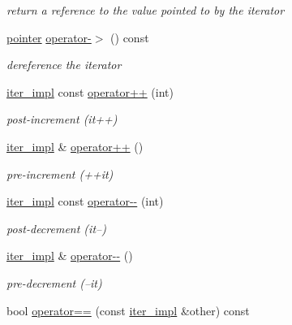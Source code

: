 \begin{DoxyCompactItemize}
\begin{DoxyCompactList}\small\item\em return a reference to the value pointed to by the iterator \end{DoxyCompactList}\item 
\hyperlink{classnlohmann_1_1detail_1_1iter__impl_a69e52f890ce8c556fd68ce109e24b360}{pointer} \hyperlink{classnlohmann_1_1detail_1_1iter__impl_a6da3d2b34528aff328f3dcb513076dec}{operator-\/$>$} () const
\begin{DoxyCompactList}\small\item\em dereference the iterator \end{DoxyCompactList}\item 
\hyperlink{classnlohmann_1_1detail_1_1iter__impl}{iter\+\_\+impl} const \hyperlink{classnlohmann_1_1detail_1_1iter__impl_a7d2397773b2dce42f30f0375a6a1d850}{operator++} (int)
\begin{DoxyCompactList}\small\item\em post-\/increment (it++) \end{DoxyCompactList}\item 
\hyperlink{classnlohmann_1_1detail_1_1iter__impl}{iter\+\_\+impl} \& \hyperlink{classnlohmann_1_1detail_1_1iter__impl_abdfe2a7f464400a7ab572782d14b922f}{operator++} ()
\begin{DoxyCompactList}\small\item\em pre-\/increment (++it) \end{DoxyCompactList}\item 
\hyperlink{classnlohmann_1_1detail_1_1iter__impl}{iter\+\_\+impl} const \hyperlink{classnlohmann_1_1detail_1_1iter__impl_a1fc43e764467b8ea4a4cdd01f629d757}{operator-\/-\/} (int)
\begin{DoxyCompactList}\small\item\em post-\/decrement (it--) \end{DoxyCompactList}\item 
\hyperlink{classnlohmann_1_1detail_1_1iter__impl}{iter\+\_\+impl} \& \hyperlink{classnlohmann_1_1detail_1_1iter__impl_a84e689fb581d651d130039f7cb81494a}{operator-\/-\/} ()
\begin{DoxyCompactList}\small\item\em pre-\/decrement (--it) \end{DoxyCompactList}\item 
bool \hyperlink{classnlohmann_1_1detail_1_1iter__impl_a2b592605b63ae7f5401996ffa3b14393}{operator==} (const \hyperlink{classnlohmann_1_1detail_1_1iter__impl}{iter\+\_\+impl} \&other) const

\end{DoxyCompactItemize}
